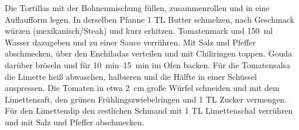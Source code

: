 Die Tortillas mit der Bohnenmischung füllen, zusammenrollen und in eine Auflaufform legen.
In derselben Pfanne \num{1} TL Butter schmelzen, nach Geschmack würzen (mexikanisch/Steak) und kurz erhitzen. 
Tomatenmark und \SI{150}{ml} Wasser dazugeben und zu einer Sauce verrühren. 
Mit Salz und Pfeffer abschmecken, über den Enchiladas verteilen und mit Chiliringen toppen.
Gouda darüber bröseln und für \SIrange{10}{15}{min} im Ofen backen. 
Für die Tomatensalsa die Limette heiß abwaschen, halbieren und die Hälfte in einer Schüssel auspressen.
Die Tomaten in etwa \SI{2}{cm} große Würfel schneiden und mit dem Limettensaft, den grünen Frühlingszwiebelringen und \num{1} TL Zucker vermengen.
Für den Limettendip den restlichen Schmand mit \num{1} TL Limettenschal verrühren und mit Salz und Pfeffer abschmecken. 
